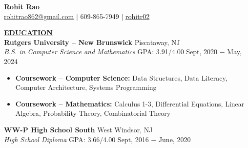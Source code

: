 \documentclass{article}
\begin{document}
\begin{center}
\thispagestyle{empty}
\LARGE \textbf{Rohit Rao\\}
\normalsize \href{mailto:rohitrao862@gmail.com}{rohitrao862@gmail.com} $\mid$ 609-865-7949 $\mid$ \faGithub \href{https://github.com/rohitr02}{ rohitr02}\\
\hrulefill
\end{center}



\noindent \textbf{\underline{EDUCATION}} \\
\textbf{Rutgers University -- New Brunswick} \hfill Piscataway, NJ \\
\textit{B.S. in Computer Science and Mathematics}  \hspace{1.40cm} GPA: 3.91/4.00 \hfill Sept, 2020 $-$ May, 2024
\begin{itemize}[noitemsep,nolistsep, leftmargin=*]
    \item {\textbf{Coursework -- Computer Science:} Data Structures, Data Literacy, Computer Architecture, Systems Programming}
    \item {\textbf{Coursework -- Mathematics:} Calculus 1-3, Differential Equations, Linear Algebra, Probability Theory, Combinatorial Theory} \\
\end{itemize}
\textbf{WW-P High School South} \hfill West Windsor, NJ \\
\textit{High School Diploma} \hfill{GPA: 3.66/4.00} \hfill Sept, 2016 $-$ June, 2020 \\
\end{document}
